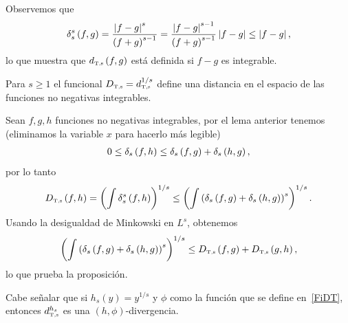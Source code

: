 Observemos que
\begin{align}
\label{AcotacionDTporL1}
\delta_{s}^{s}\left( f,g \right) = \frac{\left| f - g \right|^{s}\ \ \ }{\left( f + g \right)^{s-1}} 
= \frac{\left| f - g \right|^{s-1}}{\left( f + g \right)^{s-1}}\left| f - g \right| \le \left| f - g \right|,
\end{align}
lo que muestra que $d_{\text{\tiny{T},s}}\left( f,g \right)$ está definida si $f-g$ es integrable.
\begin{proposition}
	\label{DTdistancia}
	Para $s \ge 1$ el funcional $D_{\text{\tiny{T},s}}=d_{\text{\tiny{T},s}}^{1/s}$ define una distancia en el espacio de las funciones no negativas integrables.
\end{proposition}
\begin{dem}
	Sean $f,g,h$ funciones no negativas integrables, por el lema anterior tenemos (eliminamos la variable $x$
	para hacerlo más legible)
	\begin{align*}
	0 \le \delta_{s}\left( f,h \right) \le \delta_{s}\left( f,g \right) + \delta_{s}\left( h,g \right),
	\end{align*}
	por lo tanto
	\begin{align*}
	D_{\text{\tiny{T},s}}\left( f,h \right) = \left( \int \delta_{s}^{s}\left( f,h \right) \right)^{1/s} \le 
	\left( \int \left( \delta_{s}\left( f,g \right) + \delta_{s}\left( h,g \right) \right)^{s} \right)^{1/s}.
	\end{align*}
	Usando la desigualdad de Minkowski en $L^{s}$, obtenemos
	\begin{align*}
	\left( \int \left( \delta_{s}\left( f,g \right) + \delta_{s}\left( h,g \right) \right)^{s} \right)^{1/s} \le 
	D_{\text{\tiny{T},s}}\left( f,g \right) + D_{\text{\tiny{T},s}}\left( g,h \right),
	\end{align*}
	lo que prueba la proposición.
\end{dem}

\begin{remark}
	Cabe señalar que si $h_s(y)=y^{1/s}$ y $\phi$ como la función que se define en~\ref{FiDT}, entonces $d_{\text{\tiny{T},s}}^{h_s}$ es una $(h,\phi)$-divergencia.
\end{remark}


